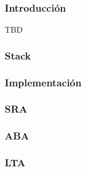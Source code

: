 \documentclass{beamer}
\begin{document}
\begin{frame}
\frametitle{Introducción}
TBD
\end{frame}

\begin{frame}
\frametitle{Stack}
\end{frame}

\begin{frame}
\frametitle{Implementación}
\end{frame}

\begin{frame}
\frametitle{SRA}
\end{frame}

\begin{frame}
\frametitle{ABA}
\end{frame}

\begin{frame}
\frametitle{LTA}
\end{frame}
\end{document}
